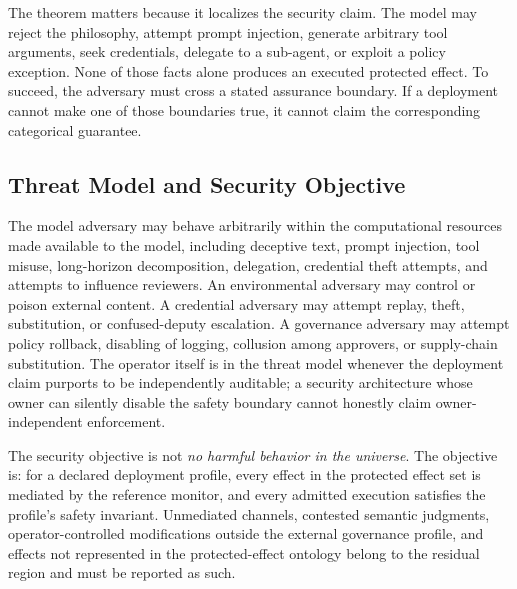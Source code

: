 \documentclass[11pt]{article}
\begin{document}
The theorem matters because it localizes the security claim. The model may reject the philosophy, attempt prompt injection, generate arbitrary tool arguments, seek credentials, delegate to a sub-agent, or exploit a policy exception. None of those facts alone produces an executed protected effect. To succeed, the adversary must cross a stated assurance boundary. If a deployment cannot make one of those boundaries true, it cannot claim the corresponding categorical guarantee.

\subsection{Threat Model and Security Objective}
The model adversary may behave arbitrarily within the computational resources made available to the model, including deceptive text, prompt injection, tool misuse, long-horizon decomposition, delegation, credential theft attempts, and attempts to influence reviewers. An environmental adversary may control or poison external content. A credential adversary may attempt replay, theft, substitution, or confused-deputy escalation. A governance adversary may attempt policy rollback, disabling of logging, collusion among approvers, or supply-chain substitution. The operator itself is in the threat model whenever the deployment claim purports to be independently auditable; a security architecture whose owner can silently disable the safety boundary cannot honestly claim owner-independent enforcement.

The security objective is not \emph{no harmful behavior in the universe}. The objective is: for a declared deployment profile, every effect in the protected effect set is mediated by the reference monitor, and every admitted execution satisfies the profile's safety invariant. Unmediated channels, contested semantic judgments, operator-controlled modifications outside the external governance profile, and effects not represented in the protected-effect ontology belong to the residual region and must be reported as such.
\end{document}
